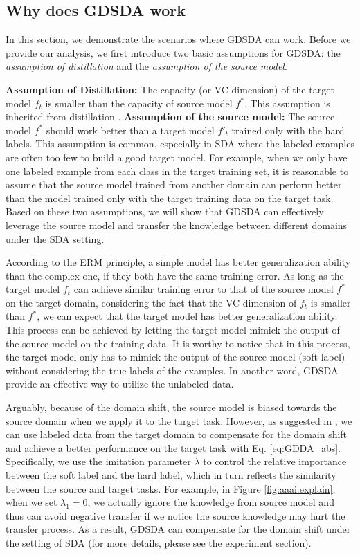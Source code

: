 \subsection{Why does GDSDA work}
In this section, we demonstrate the scenarios where GDSDA can work. Before we provide our analysis, we first introduce two basic assumptions for GDSDA: the \textit{assumption of distillation} and the \textit{assumption of the source model}.

\textbf{Assumption of Distillation:} The capacity (or VC dimension) of the target model $f_t$ is smaller than the capacity of source model $f^*$. This assumption is inherited from distillation \cite{lopez2015unifying}.
\textbf{Assumption of the source model:} The source model $f^*$ should work better than a target model $f'_t$ trained only with the hard labels. This assumption is common, especially in SDA where the labeled examples are often too few to build a good target model. For example, when we only have one labeled example from each class in the target training set, it is reasonable to assume that the source model trained from another domain can perform better than the model trained only with the target training data on the target task. Based on these two assumptions, we will show that GDSDA can effectively leverage the source model and transfer the knowledge between different domains under the SDA setting.

According to the ERM principle\cite{vapnik1999overview}, a simple model has better generalization ability than the complex one, if they both have the same training error.
As long as the target model $f_t$ can achieve similar training error to that of the source model $f^*$ on the target domain, considering the fact that the VC dimension of $f_t$ is smaller than $f^*$, we can expect that the target model has better generalization ability. This process can be achieved by letting the target model mimick the output of the source model on the training data.
It is worthy to notice that in this process, the target model only has to mimick the output of the source model (soft label) without considering the true labels of the examples. In another word, GDSDA provide an effective way to utilize the unlabeled data.

Arguably, because of the domain shift, the source model is biased towards the source domain when we apply it to the target task. However, as suggested in \cite{hinton2015distilling}, we can use labeled data from the target domain to compensate for the domain shift and achieve a better performance on the target task with Eq. \eqref{eq:GDDA_abs}. Specifically, we use the imitation parameter $\lambda$ to control the relative importance between the soft label and the hard label, which in turn reflects the similarity between the source and target tasks. 
For example, in Figure \ref{fig:aaai:explain}, when we set $\lambda_1=0$, we actually ignore the knowledge from source model and thus can avoid negative transfer if we notice the source knowledge may hurt the transfer process.
As a result, GDSDA can compensate for the domain shift under the setting of SDA (for more details, please see the experiment section).

